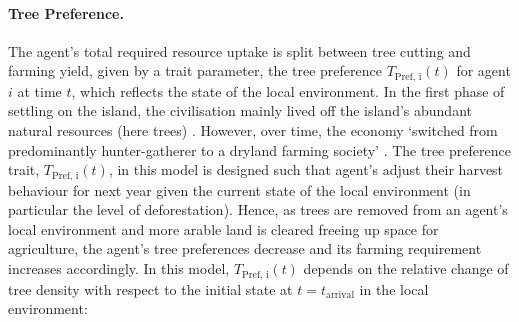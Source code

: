 \paragraph{Tree Preference.}
The agent's total required resource uptake is split between tree cutting and farming yield, given by a trait parameter, the tree preference $T_\text{Pref, i}(t)$ for agent $i$ at time $t$, which reflects the state of the local environment.
In the first phase of settling on the island, the civilisation mainly lived off the island's abundant natural resources (here trees) \citep{Bahn2017}.
However, over time, the economy `switched from predominantly hunter-gatherer to a dryland farming society' \citep{Louwagie2006}.
The tree preference trait, $T_\text{Pref, i}(t)$, in this model is designed such that agent's adjust their harvest behaviour for next year given the current state of the local environment (in particular the level of deforestation).
Hence, as trees are removed from an agent's local environment and more arable land is cleared freeing up space for agriculture, the agent's tree preferences decrease and its farming requirement increases accordingly.
In this model, $T_\text{Pref, i}(t)$ depends on the relative change of tree density with respect to the initial state at $t=t_\text{arrival}$ in the local environment:

